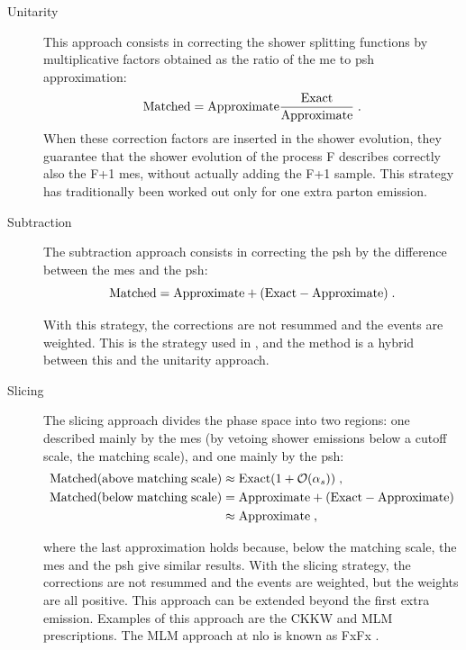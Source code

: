 \begin{description}
\item[Unitarity] This approach consists in correcting the shower splitting functions by multiplicative factors obtained as the ratio of the \gls{me} to \gls{psh} approximation:
$$
\rm{Matched} = \rm{Approximate}\frac{\rm{Exact}}{Approximate} \; .
$$
\noindent When these correction factors are inserted in the shower evolution, they guarantee that the shower evolution of the process F describes correctly also the F+1 \glspl{me}, without actually adding the F+1 sample. This strategy has traditionally been worked out only for one extra parton emission. 

\item[Subtraction] The subtraction approach consists in correcting the \gls{psh} by the difference between the \glspl{me} and the \gls{psh}:
$$
\rm{Matched} = \rm{Approximate} + (\rm{Exact}- \rm{Approximate}) \; .
$$

\noindent With this strategy, the corrections are not resummed and the events are weighted. This is the strategy used in \mcatnlo \cite{Frixione:2002ik,Frixione:2003ei,Frixione:2008ym}, and the \Powheg method \cite{Frixione:2007vw} is a hybrid between this and the unitarity approach.

\item[Slicing] The slicing approach divides the phase space into two regions: one described mainly by the \glspl{me} (by vetoing shower emissions below a cutoff scale, the matching scale), and one mainly by the \gls{psh}:
\begin{equation*}
\begin{split}
 {\rm{Matched (above \; matching \;  scale)}} &\approx {\rm{Exact}} (1 + {\mathcal{O}} ( \alpha_s)) \; , \\
{\rm{Matched (below \; matching \;  scale)} } &= {\rm{Approximate}} + ({\rm{Exact}}- {\rm{Approximate}})  \\
& \approx {\rm{Approximate}}    \; , \nonumber
\end{split}
\end{equation*}


\noindent where the last approximation holds because, below the matching scale, the \glspl{me} and the \gls{psh} give similar results. 
With the slicing strategy, the corrections are not resummed and the events are weighted, but the weights are all positive. This approach can be extended beyond the first extra emission. 
Examples of this approach are the CKKW \cite{Catani:2001cc} and MLM \cite{Mangano:2006rw,Mrenna:2003if} prescriptions. The MLM approach at \gls{nlo} is known as FxFx \cite{Frederix:2012ps}. 

\end{description}


